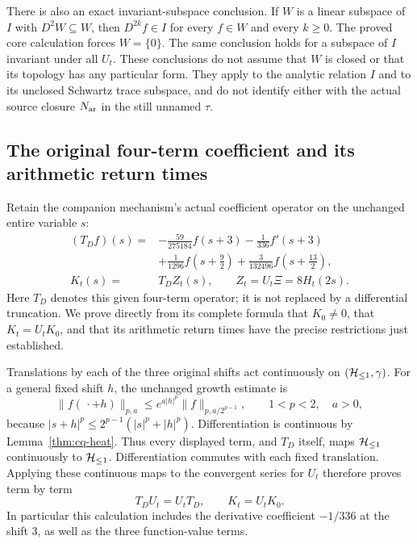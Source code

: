 There is also an exact invariant-subspace conclusion.
If $W$ is a linear subspace of $I$ with $D^2W\subseteq W$,
then $D^{2k}f\in I$ for every $f\in W$ and every $k\geq0$.
The proved core calculation forces $W=\{0\}$.
The same conclusion holds for a subspace of $I$ invariant
under all $U_t$. These conclusions do not assume that $W$
is closed or that its topology has any particular form.
They apply to the analytic relation $I$ and to its unclosed
Schwartz trace subspace, and do not identify either with
the actual source closure $N_{\rm ar}$ in the still unnamed $\tau$.

\subsection{The original four-term coefficient and its arithmetic return times}
\label{sec:cq-xi4-heat-returns}
Retain the companion mechanism's actual coefficient operator
on the unchanged entire variable $s$:
\begin{equation}\label{eq:cq-xi4-original-operator}
 \begin{aligned}
 (T_Df)(s)={}&-\frac{59}{275184}f(s+3)
             -\frac1{336}f'(s+3)\\
            &+\frac1{1296}f(s+\tfrac92)
             +\frac3{132496}f(s+\tfrac{13}2),\\
 K_t(s)={}&T_DZ_t(s),\qquad Z_t=U_t\Xi=8H_t(2s).
 \end{aligned}
\end{equation}
Here $T_D$ denotes this given four-term operator; it is not
replaced by a differential truncation. We prove directly from
its complete formula that $K_0\ne0$, that $K_t=U_tK_0$,
and that its arithmetic return times have the precise restrictions
just established.

Translations by each of the three original shifts act
continuously on $(\mathcal H_{\leq 1},\gamma)$. For a general fixed shift $h$,
the unchanged growth estimate is
\[
 \|f(\,\cdot+h)\|_{p,a}
 \leq e^{a|h|^p}\|f\|_{p,a/2^{p-1}},
 \qquad 1<p<2,\quad a>0,
\]
because $|s+h|^p\leq2^{p-1}(|s|^p+|h|^p)$.
Differentiation is continuous by Lemma~\ref{thm:cq-heat}.
Thus every displayed term, and $T_D$ itself, maps $\mathcal H_{\leq 1}$
continuously to $\mathcal H_{\leq 1}$. Differentiation commutes with each
fixed translation. Applying these continuous maps to the
convergent series for $U_t$ therefore proves term by term
\begin{equation}\label{eq:cq-xi4-heat-intertwiner}
 T_DU_t=U_tT_D,\qquad K_t=U_tK_0.
\end{equation}
In particular this calculation includes the derivative coefficient
$-1/336$ at the shift $3$, as well as the three function-value terms.

